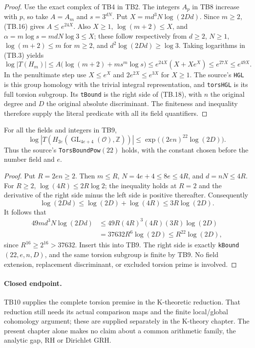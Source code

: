 \begin{proof}
Use the exact complex of TB4 in TB2.  The integers $A_p$ in
TB8 increase with $p$, so take $A=A_m$ and $s=3^{dN}$.
Put $X=m d^3N\log(2Dd)$.  Since $m\ge2$, (TB.16) gives
$A\le e^{24X}$.  Also $X\ge1$,
$\log(m+2)\le X$, and
$\alpha=m\log s=m dN\log3\le X$; these follow respectively
from $d\ge2$, $N\ge1$, $\log(m+2)\le m$ for $m\ge2$,
and $d^2\log(2Dd)\ge\log3$.
Taking logarithms in (TB.3) yields
\[
 \log|T(H_m)|
    \le A\bigl(\log(m+2)+m s^m\log s\bigr)
    \le e^{24X}(X+Xe^X)
    \le e^{27X}\le e^{49X}.
\]
In the penultimate step use $X\le e^X$ and
$2e^{2X}\le e^{3X}$ for $X\ge1$.
The source's \texttt{HGL} is this group homology with the
trivial integral representation, and \texttt{torsHGL} is its
full torsion subgroup.  Its \texttt{tBound} is the right side
of (TB.18), with $n$ the original degree and $D$ the original
absolute discriminant.  The finiteness and inequality therefore
supply the literal predicate with all its field quantifiers.
\end{proof}

\begin{theorem}
\label{thm:tb-power}
For all the fields and integers in TB9,
\[
 \log|T(H_{2e}(\operatorname{GL}_{4e+4}(\mathcal O),\mathbb Z))|
        \le \exp\!\bigl((2en)^{22}\log(2D)\bigr).
        \tag{TB.19}
\]
Thus the source's \texttt{TorsBoundPow}$(22)$ holds, with the
constant chosen before the number field and $e$.
\end{theorem}

\begin{proof}
Put $R=2en\ge2$.  Then $m\le R$,
$N=4e+4\le8e\le4R$, and $d=nN\le4R$.
For $R\ge2$,
$\log(4R)\le2R\log2$; the inequality holds at $R=2$ and the
derivative of the right side minus the left side is positive
thereafter.  Consequently
\[
 \log(2Dd)\le\log(2D)+\log(4R)
           \le3R\log(2D).
\]
It follows that
\[
 \begin{split}
 49m d^3N\log(2Dd)
 &\le 49R(4R)^3(4R)(3R)\log(2D)\\
 &=37632R^6\log(2D)
 \le R^{22}\log(2D),
 \end{split}
\]
since $R^{16}\ge2^{16}>37632$.
Insert this into TB9.  The right side is exactly
\texttt{kBound}$(22,e,n,D)$, and the same torsion subgroup is
finite by TB9.  No field extension, replacement discriminant,
or excluded torsion prime is involved.
\end{proof}

\paragraph{Closed endpoint.}
TB10 supplies the complete torsion premise in the K-theoretic
reduction.  That reduction still needs its actual comparison
maps and the finite local/global cohomology argument; these
are supplied separately in the K-theory chapter.  The present
chapter alone makes no claim about a common arithmetic family,
the analytic gap, RH or Dirichlet GRH.
